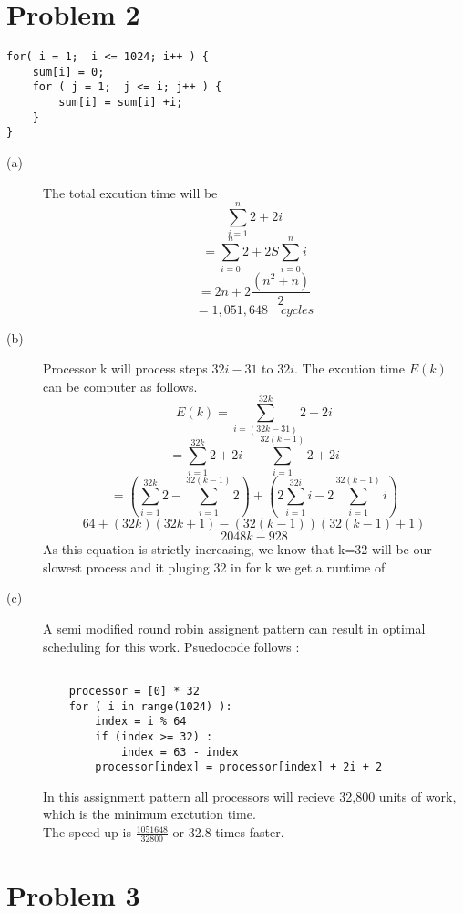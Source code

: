 \documentclass{article}
\begin{document}
\section{Problem 2}
\begin{lstlisting}
for( i = 1;  i <= 1024; i++ ) { 
    sum[i] = 0; 
    for ( j = 1;  j <= i; j++ ) { 
        sum[i] = sum[i] +i;
    }
}
\end{lstlisting}
\begin{description}
	\item[(a)] The total excution time will be 
	\[\sum\limits_{i=1}^{n}{2 + 2i}\]
	\[= \sum\limits_{i=0}^{n}{2} + 2S\sum\limits_{i=0}^{n}{i}\]
	\[= 2n + 2\frac{(n^2 + n)}{2}\]
	\[= 1,051,648 \quad cycles\]
	\item[(b)] Processor k will process steps $32i-31$ to $32i$. The excution time $E(k)$ can be computer as follows.
	\[E(k) = \sum\limits_{i=(32k - 31)}^{32k}{2 + 2i}\]
	\[= \sum\limits_{i=1}^{32k}{2 + 2i} -\sum\limits_{i=1}^{32(k-1)}{2 + 2i}\]
	\[= (\sum\limits_{i=1}^{32k}{2} - \sum\limits_{i=1}^{32(k-1)}{2}  ) + (2\sum\limits_{i=1}^{32i}{i} - 2\sum\limits_{i=1}^{32(k-1)}{i})\]
	\[64 + (32k)(32k + 1 ) - (32(k-1))(32(k-1) + 1)\]
	\[2048k - 928\]
	As this equation is strictly increasing, we know that k=32 will be our slowest process and it pluging 32 in for k we get a runtime of 
	\item[(c)] A semi modified round robin assignent pattern can result in optimal scheduling for this work. Psuedocode follows : 
	\begin{lstlisting}
	
	processor = [0] * 32 
	for ( i in range(1024) ):
	    index = i % 64
	    if (index >= 32) : 
	        index = 63 - index 
	    processor[index] = processor[index] + 2i + 2       
	\end{lstlisting}
	
	In this assignment pattern all processors will recieve 32,800 units of work, which is the minimum exctution time. 
	\\The speed up is $\frac{1051648}{32800}$ or 32.8 times faster.  
	
\end{description}
\section{Problem 3}
\end{document}
